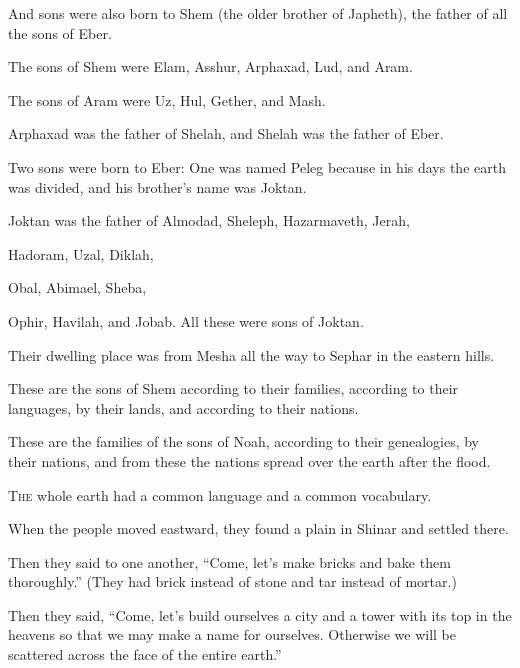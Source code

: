 \begin{scripture}
 And sons were also born to Shem (the older brother of Japheth), the father of all the sons of Eber.
\everypar{}

 The sons of Shem were Elam, Asshur, Arphaxad, Lud, and Aram.
 The sons of Aram were Uz, Hul, Gether, and Mash.
 Arphaxad was the father of Shelah, and Shelah was the father of Eber.
 Two sons were born to Eber: One was named Peleg because in his days the earth was divided, and his brother's name was Joktan.
 Joktan was the father of Almodad, Sheleph, Hazarmaveth, Jerah,
 Hadoram, Uzal, Diklah,
 Obal, Abimael, Sheba,
 Ophir, Havilah, and Jobab. All these were sons of Joktan.
 Their dwelling place was from Mesha all the way to Sephar in the eastern hills.
 These are the sons of Shem according to their families, according to their languages, by their lands, and according to their nations.
\everypar{}

 These are the families of the sons of Noah, according to their genealogies, by their nations, and from these the nations spread over the earth after the flood.

 \allowchapbreak\hypertarget{ch-genesis-11}{}\lettrine[lines=5]{\color{pentateuch}T}{\textsc{he}} whole earth had a common language and a common vocabulary.\everypar{}
 When the people moved eastward, they found a plain in Shinar and settled there.
 Then they said to one another, ``Come, let's make bricks and bake them thoroughly.'' (They had brick instead of stone and tar instead of mortar.)
 Then they said, ``Come, let's build ourselves a city and a tower with its top in the heavens so that we may make a name for ourselves. Otherwise we will be scattered across the face of the entire earth.''
\everypar{}


\end{scripture}
